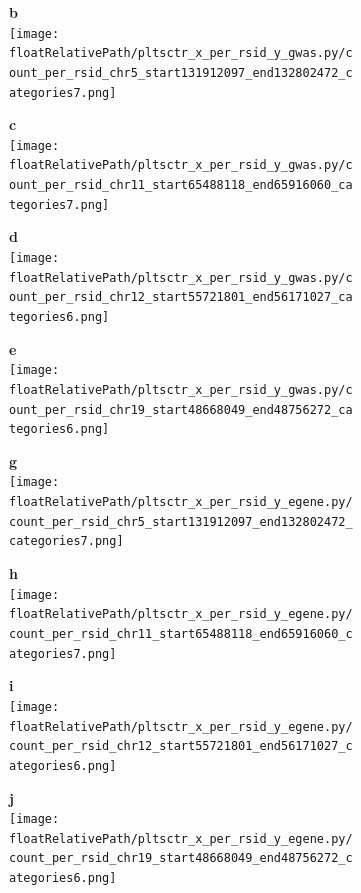 %
%
%
\begin{figure}[!tbp]

\begin{subfigure}[]{.24\textwidth}
\textbf{b}
\\
\texttt{[image: \\floatRelativePath/pltsctr\_x\_per\_rsid\_y\_gwas.py/count\_per\_rsid\_chr5\_start131912097\_end132802472\_categories7.png]}
\end{subfigure}
%
\begin{subfigure}[]{.24\textwidth}
\textbf{c}
\\
\texttt{[image: \\floatRelativePath/pltsctr\_x\_per\_rsid\_y\_gwas.py/count\_per\_rsid\_chr11\_start65488118\_end65916060\_categories7.png]}
\end{subfigure}
%
\begin{subfigure}[]{.24\textwidth}
\textbf{d}
\\
\texttt{[image: \\floatRelativePath/pltsctr\_x\_per\_rsid\_y\_gwas.py/count\_per\_rsid\_chr12\_start55721801\_end56171027\_categories6.png]}
\end{subfigure}
%
\begin{subfigure}[]{.24\textwidth}
\textbf{e}
\\
\texttt{[image: \\floatRelativePath/pltsctr\_x\_per\_rsid\_y\_gwas.py/count\_per\_rsid\_chr19\_start48668049\_end48756272\_categories6.png]}
\end{subfigure}

\begin{subfigure}[]{.24\textwidth}
\textbf{g}
\\
\texttt{[image: \\floatRelativePath/pltsctr\_x\_per\_rsid\_y\_egene.py/count\_per\_rsid\_chr5\_start131912097\_end132802472\_categories7.png]}
\end{subfigure}
%
\begin{subfigure}[]{.24\textwidth}
\textbf{h}
\\
\texttt{[image: \\floatRelativePath/pltsctr\_x\_per\_rsid\_y\_egene.py/count\_per\_rsid\_chr11\_start65488118\_end65916060\_categories7.png]}
\end{subfigure}
%
\begin{subfigure}[]{.24\textwidth}
\textbf{i}
\\
\texttt{[image: \\floatRelativePath/pltsctr\_x\_per\_rsid\_y\_egene.py/count\_per\_rsid\_chr12\_start55721801\_end56171027\_categories6.png]}
\end{subfigure}
%
\begin{subfigure}[]{.24\textwidth}
\textbf{j}
\\
\texttt{[image: \\floatRelativePath/pltsctr\_x\_per\_rsid\_y\_egene.py/count\_per\_rsid\_chr19\_start48668049\_end48756272\_categories6.png]}
\end{subfigure}


\end{figure}
